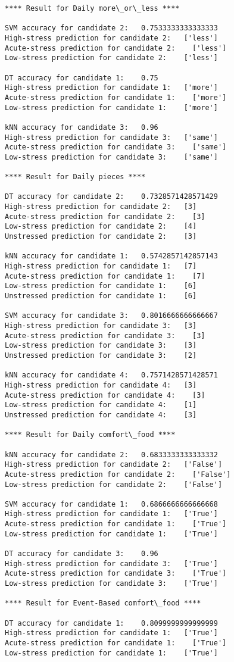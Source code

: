 \begin{lstlisting}[label={model-selection},caption={Result of model selection and prediction for each task},captionpos=b]
**** Result for Daily more\_or\_less ****

SVM accuracy for candidate 2:	0.7533333333333333
High-stress prediction for candidate 2:	  ['less']
Acute-stress prediction for candidate 2:	['less']
Low-stress prediction for candidate 2:	  ['less']

DT accuracy for candidate 1:	0.75
High-stress prediction for candidate 1:	  ['more']
Acute-stress prediction for candidate 1:	['more']
Low-stress prediction for candidate 1:	  ['more']

kNN accuracy for candidate 3:	0.96
High-stress prediction for candidate 3:	  ['same']
Acute-stress prediction for candidate 3:	['same']
Low-stress prediction for candidate 3:	  ['same']

**** Result for Daily pieces ****

DT accuracy for candidate 2:	0.7328571428571429
High-stress prediction for candidate 2:	  [3]
Acute-stress prediction for candidate 2:	[3]
Low-stress prediction for candidate 2:	  [4]
Unstressed prediction for candidate 2:	  [3]

kNN accuracy for candidate 1:	0.5742857142857143
High-stress prediction for candidate 1:	  [7]
Acute-stress prediction for candidate 1:	[7]
Low-stress prediction for candidate 1:	  [6]
Unstressed prediction for candidate 1:	  [6]

SVM accuracy for candidate 3:	0.8016666666666667
High-stress prediction for candidate 3:	  [3]
Acute-stress prediction for candidate 3:	[3]
Low-stress prediction for candidate 3:	  [3]
Unstressed prediction for candidate 3:	  [2]

kNN accuracy for candidate 4:	0.7571428571428571
High-stress prediction for candidate 4:	  [3]
Acute-stress prediction for candidate 4:	[3]
Low-stress prediction for candidate 4:	  [1]
Unstressed prediction for candidate 4:	  [3]

**** Result for Daily comfort\_food ****

kNN accuracy for candidate 2:	0.6833333333333332
High-stress prediction for candidate 2:	  ['False']
Acute-stress prediction for candidate 2:	['False']
Low-stress prediction for candidate 2:	  ['False']

SVM accuracy for candidate 1:	0.6866666666666668
High-stress prediction for candidate 1:	  ['True']
Acute-stress prediction for candidate 1:	['True']
Low-stress prediction for candidate 1:	  ['True']

DT accuracy for candidate 3:	0.96
High-stress prediction for candidate 3:	  ['True']
Acute-stress prediction for candidate 3:	['True']
Low-stress prediction for candidate 3:	  ['True']

**** Result for Event-Based comfort\_food ****

DT accuracy for candidate 1:	0.8099999999999999
High-stress prediction for candidate 1:	  ['True']
Acute-stress prediction for candidate 1:	['True']
Low-stress prediction for candidate 1:	  ['True']
\end{lstlisting}

